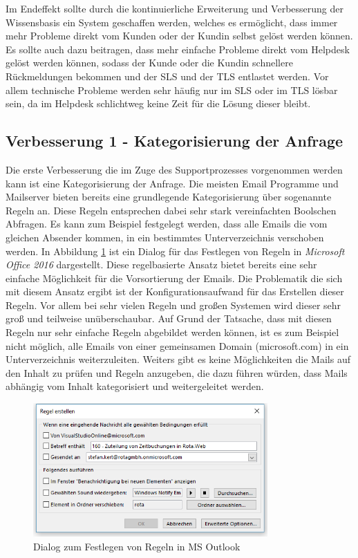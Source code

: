Im Endeffekt sollte durch die kontinuierliche Erweiterung und Verbesserung der Wissensbasis ein System geschaffen werden, welches es ermöglicht, dass immer mehr Probleme direkt vom Kunden oder der Kundin selbst gelöst werden können. Es sollte auch dazu beitragen, dass mehr einfache Probleme direkt vom Helpdesk gelöst werden können, sodass der Kunde oder die Kundin schnellere Rückmeldungen bekommen und der SLS und der TLS entlastet werden. Vor allem technische Probleme werden sehr häufig nur im SLS oder im TLS lösbar sein, da im Helpdesk schlichtweg keine Zeit für die Lösung dieser bleibt. 

\subsection{Verbesserung 1 - Kategorisierung der Anfrage}
\label{sec:improvement1}
Die erste Verbesserung die im Zuge des Supportprozesses vorgenommen werden kann ist eine Kategorisierung der Anfrage. Die meisten Email Programme und Mailserver bieten bereits eine grundlegende Kategorisierung über sogenannte Regeln an. Diese Regeln entsprechen dabei sehr stark vereinfachten Boolschen Abfragen. Es kann zum Beispiel festgelegt werden, dass alle Emails die vom gleichen Absender kommen, in ein bestimmtes Unterverzeichnis verschoben werden. In Abbildung \ref{fig:outlook-rules} ist ein Dialog für das Festlegen von Regeln in \textit{Microsoft Office 2016} dargestellt. Diese regelbasierte Ansatz bietet bereits eine sehr einfache Möglichkeit für die Vorsortierung der Emails. Die Problematik die sich mit diesem Ansatz ergibt ist der Konfigurationsaufwand für das Erstellen dieser Regeln. Vor allem bei sehr vielen Regeln und großen Systemen wird dieser sehr groß und teilweise unüberschaubar. Auf Grund der Tatsache, dass mit diesen Regeln nur sehr einfache Regeln abgebildet werden können, ist es zum Beispiel nicht möglich, alle Emails von einer gemeinsamen Domain (microsoft.com) in ein Unterverzeichnis weiterzuleiten. Weiters gibt es keine Möglichkeiten die Mails auf den Inhalt zu prüfen und Regeln anzugeben, die dazu führen würden, dass Mails abhängig vom Inhalt kategorisiert und weitergeleitet werden.

\begin{figure}[ht]
	\centering
		\includegraphics[width=0.80\textwidth]{images/outlook_rules.PNG}
	\caption{Dialog zum Festlegen von Regeln in MS Outlook}
	\label{fig:outlook-rules}
\end{figure}

